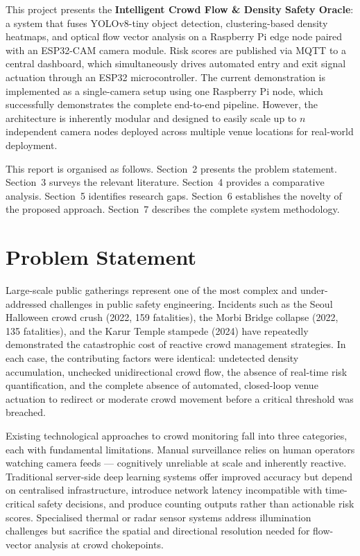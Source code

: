 \documentclass[12pt,a4paper]{article}
\begin{document}
This project presents the \textbf{Intelligent Crowd Flow \& Density Safety Oracle}: a system that fuses YOLOv8-tiny object detection, clustering-based density heatmaps, and optical flow vector analysis on a Raspberry Pi edge node paired with an ESP32-CAM camera module. Risk scores are published via MQTT to a central dashboard, which simultaneously drives automated entry and exit signal actuation through an ESP32 microcontroller. The current demonstration is implemented as a single-camera setup using one Raspberry Pi node, which successfully demonstrates the complete end-to-end pipeline. However, the architecture is inherently modular and designed to easily scale up to $n$ independent camera nodes deployed across multiple venue locations for real-world deployment.

This report is organised as follows. Section~2 presents the problem statement. Section~3 surveys the relevant literature. Section~4 provides a comparative analysis. Section~5 identifies research gaps. Section~6 establishes the novelty of the proposed approach. Section~7 describes the complete system methodology.

\section{Problem Statement}

Large-scale public gatherings represent one of the most complex and under-addressed challenges in public safety engineering. Incidents such as the Seoul Halloween crowd crush (2022, 159 fatalities), the Morbi Bridge collapse (2022, 135 fatalities), and the Karur Temple stampede (2024) have repeatedly demonstrated the catastrophic cost of reactive crowd management strategies. In each case, the contributing factors were identical: undetected density accumulation, unchecked unidirectional crowd flow, the absence of real-time risk quantification, and the complete absence of automated, closed-loop venue actuation to redirect or moderate crowd movement before a critical threshold was breached.

Existing technological approaches to crowd monitoring fall into three categories, each with fundamental limitations. Manual surveillance relies on human operators watching camera feeds — cognitively unreliable at scale and inherently reactive. Traditional server-side deep learning systems offer improved accuracy but depend on centralised infrastructure, introduce network latency incompatible with time-critical safety decisions, and produce counting outputs rather than actionable risk scores. Specialised thermal or radar sensor systems address illumination challenges but sacrifice the spatial and directional resolution needed for flow-vector analysis at crowd chokepoints.
\end{document}
